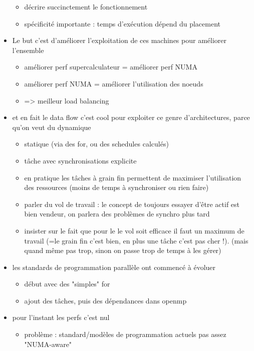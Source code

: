 \begin{itemize}
  \begin{itemize}
    \item décrire succinctement le fonctionnement
    \item spécificité importante : temps d'exécution dépend du placement
  \end{itemize}
  \item Le but c'est d'améliorer l'exploitation de ces machines pour améliorer l'ensemble
  \begin{itemize}
    \item améliorer perf supercalculateur = améliorer perf NUMA
    \item améliorer perf NUMA = améliorer l'utilisation des noeuds
    \item => meilleur load balancing
  \end{itemize}
  \item et en fait le data flow c'est cool pour exploiter ce genre d'architectures, parce qu'on veut du dynamique
  \begin{itemize}
    \item statique (via des for, ou des schedules calculés)
    \item tâche avec synchronisations explicite
    \item en pratique les tâches à grain fin permettent de maximiser l'utilisation des ressources (moins de temps à synchroniser ou rien faire)
    \item parler du vol de travail : le concept de toujours essayer d'être actif est bien vendeur, on parlera des problèmes de synchro plus tard
    \item insister sur le fait que pour le le vol soit efficace il faut un maximum de travail (=le grain fin c'est bien, en plus une tâche c'est pas cher !). (mais quand même pas trop, sinon on passe trop de temps à les gérer)
  \end{itemize}
  \item les standards de programmation parallèle ont commencé à évoluer
  \begin{itemize}
    \item début avec des "simples" for
    \item ajout des tâches, puis des dépendances dans openmp
  \end{itemize}
  \item pour l'instant les perfs c'est nul
  \begin{itemize}
    \item problème : standard/modèles de programmation actuels pas assez "NUMA-aware"

\end{itemize}
\end{itemize}
